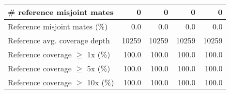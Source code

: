 \documentclass[12pt,a4paper]{article}
\begin{document}
\begin{table}[ht]
\begin{center}
\begin{tabular}{|l*{4}{|r}|}
\# reference misjoint mates & 0 & 0 & 0 & 0 \\ \hline
Reference misjoint mates (\%) & 0.0 & 0.0 & 0.0 & 0.0 \\ \hline
Reference avg. coverage depth & 10259 & 10259 & 10259 & 10259 \\ \hline
Reference coverage $\geq$ 1x (\%) & 100.0 & 100.0 & 100.0 & 100.0 \\ \hline
Reference coverage $\geq$ 5x (\%) & 100.0 & 100.0 & 100.0 & 100.0 \\ \hline
Reference coverage $\geq$ 10x (\%) & 100.0 & 100.0 & 100.0 & 100.0 \\ \hline
\end{tabular}
\end{center}
\end{table}
\end{document}
